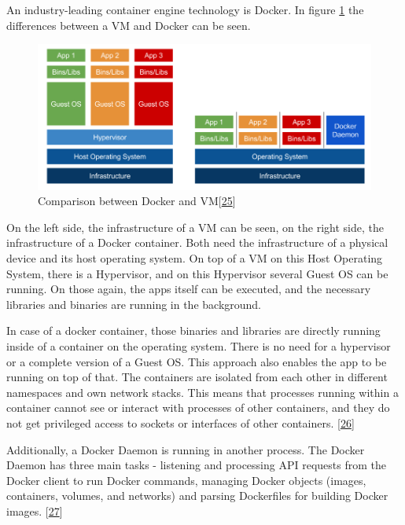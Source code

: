 \documentclass[12pt,english,a4paper,oneside,,tablecaptionabove]{scrbook}
\begin{document}
An industry-leading container engine technology is Docker. In figure
\ref{fig:docker_vm} the differences between a \acs{VM} and Docker can be
seen.

\begin{figure}
\hypertarget{fig:docker_vm}{%
\centering
\includegraphics[width=5.20833in,height=\textheight]{images/chapter2/docker_vm.png}
\caption{Comparison between Docker and
VM{[}\protect\hyperlink{ref-Mikesir87}{25}{]}}\label{fig:docker_vm}
}
\end{figure}

On the left side, the infrastructure of a VM can be seen, on the right
side, the infrastructure of a Docker container. Both need the
infrastructure of a physical device and its host operating system. On
top of a VM on this Host Operating System, there is a Hypervisor, and on
this Hypervisor several Guest OS can be running. On those again, the
apps itself can be executed, and the necessary libraries and binaries
are running in the background.

In case of a docker container, those binaries and libraries are directly
running inside of a container on the operating system. There is no need
for a hypervisor or a complete version of a Guest OS. This approach also
enables the app to be running on top of that. The containers are
isolated from each other in different namespaces and own network stacks.
This means that processes running within a container cannot see or
interact with processes of other containers, and they do not get
privileged access to sockets or interfaces of other containers.
{[}\protect\hyperlink{ref-DockerDocumentation}{26}{]}

Additionally, a Docker Daemon is running in another process. The Docker
Daemon has three main tasks - listening and processing API requests from
the Docker client to run Docker commands, managing Docker objects
(images, containers, volumes, and networks) and parsing Dockerfiles for
building Docker images. {[}\protect\hyperlink{ref-Lipke2017}{27}{]}
\end{document}
